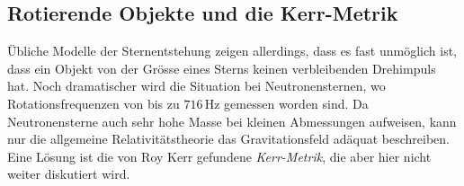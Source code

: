 \subsection{Rotierende Objekte und die Kerr-Metrik}
Übliche Modelle der Sternentstehung zeigen allerdings, dass es fast
unmöglich ist, dass ein Objekt von der Grösse eines Sterns keinen 
verbleibenden Drehimpuls hat.
Noch dramatischer wird die Situation bei Neutronensternen, wo 
Rotationsfrequenzen von bis zu $716\,\text{Hz}$ gemessen worden sind.
Da Neutronensterne auch sehr hohe Masse bei kleinen Abmessungen
aufweisen, kann nur die allgemeine Relativitätstheorie das Gravitationsfeld
adäquat beschreiben.
Eine Lösung ist die von Roy Kerr gefundene \emph{Kerr-Metrik},
die aber hier nicht weiter diskutiert wird.
%
%

